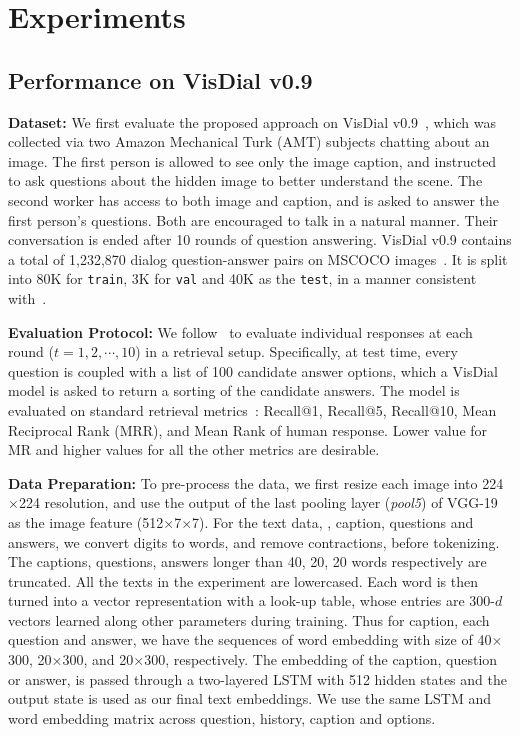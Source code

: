 \documentclass[10pt,twocolumn,letterpaper]{article}
\begin{document}
\section{Experiments}\label{sec:ex}
\vspace{-3pt}
\subsection{Performance on VisDial v0.9~\cite{das2017visual}}\label{sec:vd}
\vspace{-3pt}
\noindent\textbf{Dataset:} We first evaluate the proposed approach on VisDial v0.9~\cite{das2017visual}, which was collected via two Amazon Mechanical Turk (AMT) subjects chatting about an image. The first person is allowed to see only the image caption, and instructed to ask questions about the hidden image to better understand the scene.  The second worker has access to both image and caption, and is asked to answer the first person's questions. Both are encouraged to talk in a natural manner. Their conversation is ended after 10 rounds of question answering. VisDial v0.9 contains a total of 1,232,870 dialog question-answer pairs on MSCOCO images~\cite{lin2014microsoft}. It is split into 80K for \verb"train", 3K  for \verb"val" and 40K as the \verb"test", in a manner consistent with~\cite{das2017visual}.

\noindent\textbf{Evaluation Protocol:} We follow~\cite{das2017visual} to evaluate individual responses at each round ($t\!=\!1,2,\cdots,10$) in a retrieval setup. Specifically, at test time, every question is coupled with a list of 100 candidate answer options, which a VisDial model is asked to return a sorting of the candidate answers. The model is
evaluated on standard retrieval metrics~\cite{das2017visual}:  Recall@1, Recall@5, Recall@10, Mean Reciprocal Rank (MRR), and
Mean Rank of human response. Lower value for MR and higher values for all the other metrics are desirable.

\noindent\textbf{Data Preparation:} To pre-process the data, we first resize each image into 224$\times$224 resolution, and use the output of the last pooling layer (\textit{pool5}) of VGG-19~\cite{simonyan2014very} as the image feature (512$\times$7$\times$7). For the text data, \ie, caption, questions and answers, we convert digits to words, and remove contractions, before tokenizing.
The captions, questions, answers longer than 40, 20, 20 words respectively are truncated.
All the texts in the experiment are lowercased. Each word is then turned into a vector representation with a look-up table, whose entries are 300-$d$ vectors learned along other parameters during training. Thus for caption, each question and answer, we have the sequences of word embedding with size of 40$\times$300, 20$\times$300, and 20$\times$300, respectively. The embedding of the caption, question or answer, is passed through a two-layered LSTM with 512 hidden states and the output state is used as our final text embeddings. We use the same LSTM and word embedding matrix across question, history, caption and options.
\end{document}
